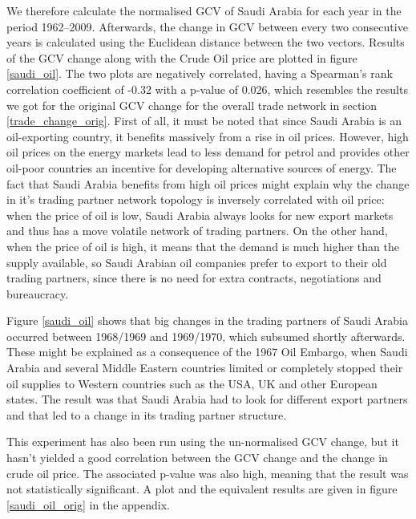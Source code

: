 We therefore calculate the normalised GCV of Saudi Arabia for each year in the period 1962--2009. Afterwards, the change in GCV between every two consecutive years is calculated using the Euclidean distance between the two vectors. Results of the GCV change along with the Crude Oil price are plotted in figure \ref{saudi_oil}. The two plots are negatively correlated, having a Spearman's rank correlation coefficient of -0.32 with a p-value of 0.026, which resembles the results we got for the original GCV change for the overall trade network in section \ref{trade_change_orig}. First of all, it must be noted that since Saudi Arabia is an oil-exporting country, it benefits massively from a rise in oil prices. However, high oil prices on the energy markets lead to less demand for petrol and provides other oil-poor countries an incentive for developing alternative sources of energy. The fact that Saudi Arabia benefits from high oil prices might explain why the change in it's trading partner network topology is 
inversely correlated with oil price: when the price of oil is low, Saudi Arabia always looks for new export markets and thus has a move volatile network of trading partners. On the other hand, when the price of oil is high, it means that the demand is much higher than the supply available, so Saudi Arabian oil companies prefer to export to their old trading partners, since there is no need for extra contracts, negotiations and bureaucracy.

Figure \ref{saudi_oil} shows that big changes in the trading partners of Saudi Arabia occurred between 1968/1969 and 1969/1970, which subsumed shortly afterwards. These might be explained as a consequence of the 1967 Oil Embargo, when Saudi Arabia and several Middle Eastern countries limited or completely stopped their oil supplies to Western countries such as the USA, UK and other European states. The result was that Saudi Arabia had to look for different export partners and that led to a change in its trading partner structure.

This experiment has also been run using the un-normalised GCV change, but it hasn't yielded a good correlation between the GCV change and the change in crude oil price. The associated p-value was also high, meaning that the result was not statistically significant. A plot and the equivalent results are given in figure \ref{saudi_oil_orig} in the appendix.


